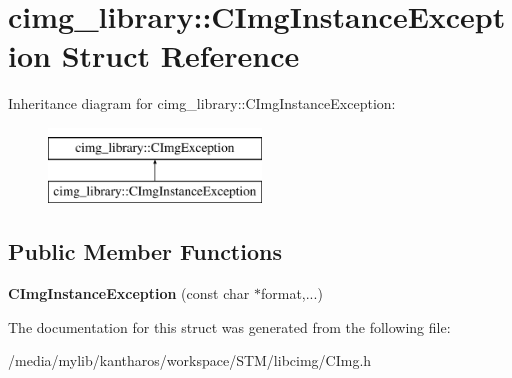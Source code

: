 \hypertarget{structcimg__library_1_1_c_img_instance_exception}{
\section{cimg\_\-library::CImgInstanceException Struct Reference}
\label{structcimg__library_1_1_c_img_instance_exception}
}
Inheritance diagram for cimg\_\-library::CImgInstanceException:\begin{figure}[H]
\begin{center}
\leavevmode
\includegraphics[height=2.000000cm]{structcimg__library_1_1_c_img_instance_exception}
\end{center}
\end{figure}
\subsection*{Public Member Functions}
\begin{DoxyCompactItemize}
\item 
\hypertarget{structcimg__library_1_1_c_img_instance_exception_aebca81f7717bcb50fc530a0c46274ab6}{
{\bfseries CImgInstanceException} (const char $\ast$format,...)}
\label{structcimg__library_1_1_c_img_instance_exception_aebca81f7717bcb50fc530a0c46274ab6}

\end{DoxyCompactItemize}


The documentation for this struct was generated from the following file:\begin{DoxyCompactItemize}
\item 
/media/mylib/kantharos/workspace/STM/libcimg/CImg.h\end{DoxyCompactItemize}
